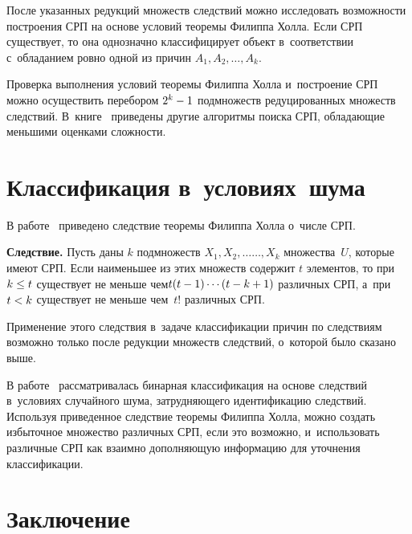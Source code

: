 \begin{multicols}{2}
  После указанных редукций множеств следствий мож\-но исследовать 
возможности по\-стро\-ения СРП на основе условий тео\-ре\-мы Филиппа Холла. Если 
СРП существует, то она однозначно классифицирует объект в~соответствии 
с~обладанием ров\-но одной из причин $A_1, A_2, \ldots , A_k$.
  
  Проверка выполнения условий тео\-ре\-мы Филиппа Холла и~по\-стро\-ение СРП 
мож\-но осуществить перебором $2^k\hm-1$ подмножеств редуцированных 
множеств следствий. В~книге~\cite{6-gr} приведены другие алгоритмы поиска 
СРП, об\-ла\-да\-ющие меньшими оцен\-ка\-ми слож\-ности.
  
  \section{Классификация в~условиях~шума}
  
  В работе~\cite{6-gr} приведено следствие тео\-ре\-мы Филиппа Холла о~чис\-ле 
СРП.
  
  \smallskip
  
  \noindent
  \textbf{Следствие.} Пусть даны $k$ подмножеств $X_1, X_2, \ldots$\linebreak $\ldots , X_k$ 
множества~$U$, которые имеют СРП. Если наименьшее из этих множеств 
содержит $t$ элементов, то при $k\hm\leq t$ существует не меньше чем\linebreak $t(t\hm-1) 
\cdots (t\hm- k\hm+1)$ раз\-лич\-ных СРП, а~при $t\hm< k$ существует не меньше чем~$t!$ 
различных СРП.
  
  \smallskip
  
  Применение этого следствия в~задаче классификации причин по следствиям 
воз\-мож\-но только после редукции множеств следствий, о~которой было сказано 
выше.
  
  В работе~\cite{7-gr} рас\-смат\-ри\-ва\-лась бинарная классификация на основе 
следствий в~условиях случайного шума, за\-труд\-ня\-юще\-го идентификацию 
следствий. Используя приведенное следствие тео\-ре\-мы Филиппа Холла, мож\-но 
создать избыточное множество различных СРП, если это воз\-мож\-но, 
и~использовать различные СРП как взаимно до\-пол\-ня\-ющую информацию для 
уточ\-не\-ния классификации. 

\vspace*{-3pt}
  
  \section{Заключение}
  

\end{multicols}

